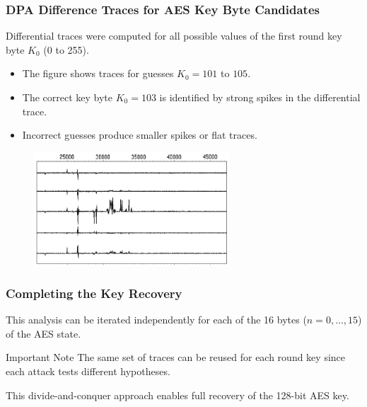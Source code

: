 \begin{frame}
    \frametitle{DPA Difference Traces for AES Key Byte Candidates}

    Differential traces were computed for all possible values of the first round key byte $K_0$ (0 to 255).

    \begin{itemize}
        \item The figure shows traces for guesses $K_0 = 101$ to $105$.
        \item The correct key byte $K_0=103$ is identified by strong spikes in the differential trace.
        \item Incorrect guesses produce smaller spikes or flat traces.
    \end{itemize}

    \begin{figure}
        \centering
        \includegraphics[width=0.65\textwidth]{main thing/Pictures/DPA_diff_trace.png}
    \end{figure}
\end{frame}

\begin{frame}
    \frametitle{Completing the Key Recovery}

    This analysis can be iterated independently for each of the 16 bytes ($n = 0, \ldots, 15$) of the AES state.

    \begin{block}{Important Note}
        The same set of traces can be reused for each round key since each attack tests different hypotheses.
    \end{block}

    This divide-and-conquer approach enables full recovery of the 128-bit AES key.
\end{frame}

